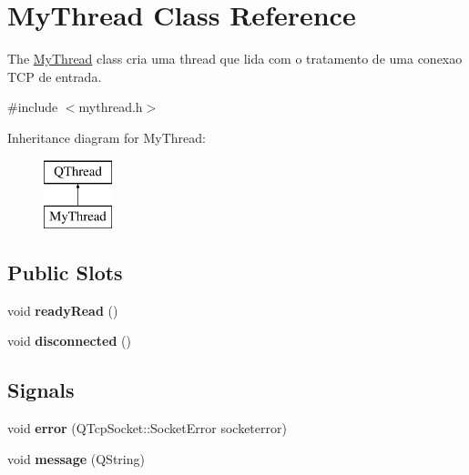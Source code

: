 \hypertarget{class_my_thread}{}\section{My\+Thread Class Reference}
\label{class_my_thread}


The \mbox{\hyperlink{class_my_thread}{My\+Thread}} class cria uma thread que lida com o tratamento de uma conexao T\+CP de entrada.  




{\ttfamily \#include $<$mythread.\+h$>$}

Inheritance diagram for My\+Thread\+:\begin{figure}[H]
\begin{center}
\leavevmode
\includegraphics[height=2.000000cm]{class_my_thread}
\end{center}
\end{figure}
\subsection*{Public Slots}
\begin{DoxyCompactItemize}
\item 
\mbox{\label{class_my_thread_a277618fdd448b927f2e250c2076fc176}} 
void {\bfseries ready\+Read} ()
\item 
\mbox{\label{class_my_thread_a447710039787ae20134a9b572487840f}} 
void {\bfseries disconnected} ()
\end{DoxyCompactItemize}
\subsection*{Signals}
\begin{DoxyCompactItemize}
\item 
\mbox{\label{class_my_thread_aebf11d93838f22c9547d0c6aa97002be}} 
void {\bfseries error} (Q\+Tcp\+Socket\+::\+Socket\+Error socketerror)
\item 
\mbox{\label{class_my_thread_ae49528d4ec1b2208240f707f5aa74adf}} 
void {\bfseries message} (Q\+String)
\end{DoxyCompactItemize}
